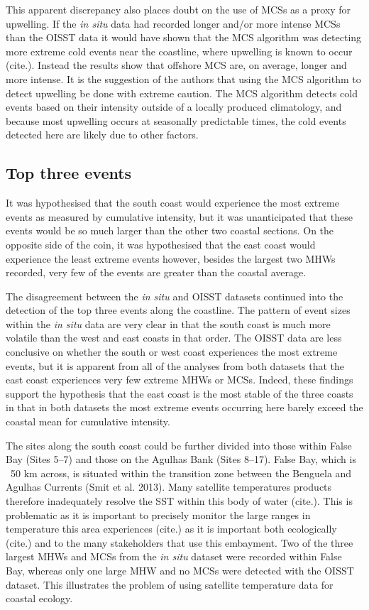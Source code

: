\documentclass[a4paper,10pt,review]{elsarticle}
\begin{document}
This apparent discrepancy also places doubt on the use of MCSs as a proxy for upwelling. If the \emph{in situ} data had recorded longer and/or more intense MCSs than the OISST data it would have shown that the MCS algorithm was detecting more extreme cold events near the coastline, where upwelling is known to occur (cite.). Instead the results show that offshore MCS are, on average, longer and more intense. It is the suggestion of the authors that using the MCS algorithm to detect upwelling be done with extreme caution. The MCS algorithm detects cold events based on their intensity outside of a locally produced climatology, and because most upwelling occurs at seasonally predictable times, the cold events detected here are likely due to other factors.

\subsection{Top three events}
It was hypothesised that the south coast would experience the most extreme events as measured by cumulative intensity, but it was unanticipated that these events would be so much larger than the other two coastal sections. On the opposite side of the coin, it was hypothesised that the east coast would experience the least extreme events however, besides the largest two MHWs recorded, very few of the events are greater than the coastal average.

The disagreement between the \emph{in situ} and OISST datasets continued into the detection of the top three events along the coastline. The pattern of event sizes within the \emph{in situ} data are very clear in that the south coast is much more volatile than the west and east coasts in that order. The OISST data are less conclusive on whether the south or west coast experiences the most extreme events, but it is apparent from all of the analyses from both datasets that the east coast experiences very few extreme MHWs or MCSs. Indeed, these findings support the hypothesis that the east coast is the most stable of the three coasts in that in both datasets the most extreme events occurring here barely exceed the coastal mean for cumulative intensity.

The sites along the south coast could be further divided into those within False Bay (Sites 5--7) and those on the Agulhas Bank (Sites 8--17). False Bay, which is ~50 km across, is situated within the transition zone between the Benguela and Agulhas Currents (Smit et al. 2013). Many satellite temperatures products therefore inadequately resolve the SST within this body of water (cite.). This is problematic as it is important to precisely monitor the large ranges in temperature this area experiences (cite.) as it is important both ecologically (cite.) and to the many stakeholders that use this embayment. Two of the three largest MHWs and MCSs from the \emph{in situ} dataset were recorded within False Bay, whereas only one large MHW and no MCSs were detected with the OISST dataset. This illustrates the problem of using satellite temperature data for coastal ecology.
\end{document}
